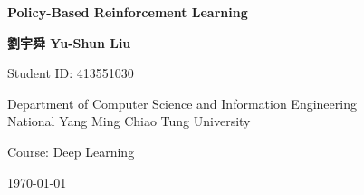 \begin{titlepage}
    \begin{center}
        \vspace*{2cm}
        
        \Huge
        \textbf{Policy-Based Reinforcement Learning}
        
        \vspace{1.5cm}
        
        \Large
        \textbf{劉宇舜 Yu-Shun Liu}
        
        \vspace{1cm}
        
        \large
        Student ID: 413551030
        
        \vspace{2cm}
        
        \large
        Department of Computer Science and Information Engineering\\
        National Yang Ming Chiao Tung University
        
        \vspace{1cm}
        
        \large
        Course: Deep Learning
        
        \vspace{1cm}
        
        \large
        \today
        
    \end{center}
\end{titlepage} 